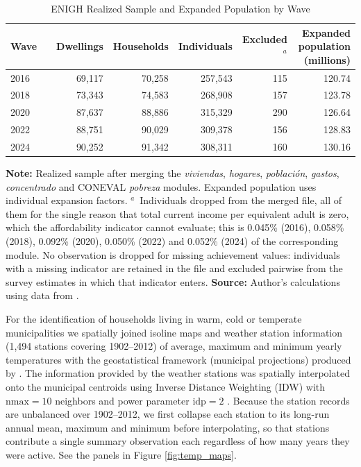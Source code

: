 \documentclass[11pt, a4paper]{article}
\begin{document}
\begin{table}[htb]
\centering
\caption{ENIGH Realized Sample and Expanded Population by Wave}
\small
\begin{tabularx}{\textwidth}{l X rrrrr}
\toprule
\toprule
Wave & & Dwellings & Households & Individuals & Excluded$^a$ & Expanded population (millions) \\ \midrule
2016 & & 69{,}117 & 70{,}258 & 257{,}543 & 115 & 120.74 \\
2018 & & 73{,}343 & 74{,}583 & 268{,}908 & 157 & 123.78 \\
2020 & & 87{,}637 & 88{,}886 & 315{,}329 & 290 & 126.64 \\
2022 & & 88{,}751 & 90{,}029 & 309{,}378 & 156 & 128.83 \\
2024 & & 90{,}252 & 91{,}342 & 308{,}311 & 160 & 130.16 \\
\bottomrule
\end{tabularx}
\begin{justify}
\scriptsize
\textbf{\textbf{Note:}} Realized sample after merging the \textit{viviendas}, \textit{hogares}, \textit{población}, \textit{gastos}, \textit{concentrado} and CONEVAL \textit{pobreza} modules. Expanded population uses individual expansion factors. $^a$~Individuals dropped from the merged file, all of them for the single reason that total current income per equivalent adult is zero, which the affordability indicator cannot evaluate; this is 0.045\% (2016), 0.058\% (2018), 0.092\% (2020), 0.050\% (2022) and 0.052\% (2024) of the corresponding module. No observation is dropped for missing achievement values: individuals with a missing indicator are retained in the file and excluded pairwise from the survey estimates in which that indicator enters. \textbf{Source:} Author's calculations using data from \textcite{enigh2016, enigh2018, enigh2020, enigh2022, enigh2024}.
\end{justify}
\label{tab:samples}
\end{table}

For the identification of households living in warm, cold or temperate municipalities we spatially joined isoline maps and weather station information (1,494 stations covering 1902--2012) of average, maximum and minimum yearly temperatures \parencite{temp_inegi, temp_inegi2} with the geostatistical framework (municipal projections) produced by \textcite{geo_inegi}. The information provided by the weather stations was spatially interpolated onto the municipal centroids using Inverse Distance Weighting (IDW) with $\mathrm{nmax}=10$ neighbors and power parameter $\mathrm{idp}=2$ \parencite{cressie1993, graler2016, pebesma2004}. Because the station records are unbalanced over 1902--2012, we first collapse each station to its long-run annual mean, maximum and minimum before interpolating, so that stations contribute a single summary observation each regardless of how many years they were active. See the panels in Figure \ref{fig:temp_maps}.
\end{document}
